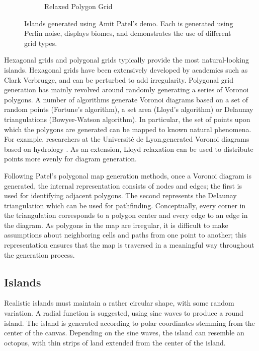 \begin{figure}
\begin{subfigure}[b]{0.45\textwidth}
                \caption{Relaxed Polygon Grid}
                \label{fig:Relaxed}
        \end{subfigure}
        \caption{Islands generated using Amit Patel's demo. Each is generated using Perlin noise, displays biomes, and demonstrates the use of different grid types.}\label{fig:gridtypes}
\end{figure}

Hexagonal grids and polygonal grids typically provide the most natural-looking islands. Hexagonal grids have been extensively developed by academics such as Clark Verbrugge\cite{Verbrugge:1997:Online}, and can be perturbed to add irregularity. Polygonal grid generation has mainly revolved around randomly generating a series of Voronoi polygons. A number of algorithms generate Voronoi diagrams based on a set of random points (Fortune's algorithm\cite{Fortune:1986:SAV:10515.10549}), a set area (Lloyd's algorithm\cite{doi:10.1137/S0036144599352836}) or Delaunay triangulations (Bowyer-Watson algorithm\cite{Watson01011981}). In particular, the set of points upon which the polygons are generated can be mapped to known natural phenomena. For example, researchers at the Universit\'{e} de Lyon,generated Voronoi diagrams based on hydrology \cite{Genevaux:2013:TGU:2461912.2461996}. As an extension, Lloyd relaxation can be used to distribute points more evenly for diagram generation.

Following Patel's polygonal map generation methods, once a Voronoi diagram is generated, the internal representation consists of nodes and edges; the first is used for identifying adjacent polygons. The second represents the Delaunay triangulation which can be used for pathfinding. Conceptually, every corner in the triangulation corresponds to a polygon center and every edge to an edge in the diagram. As polygons in the map are irregular, it is difficult to make assumptions about neighboring cells and paths from one point to another; this representation ensures that the map is traversed in a meaningful way throughout the generation process.

\subsection{Islands}

Realistic islands must maintain a rather circular shape, with some random variation. A radial function is suggested, using sine waves to produce a round island. The island is generated according to polar coordinates stemming from the center of the canvas. Depending on the sine waves, the island can resemble an octopus, with thin strips of land extended from the center of the island.

